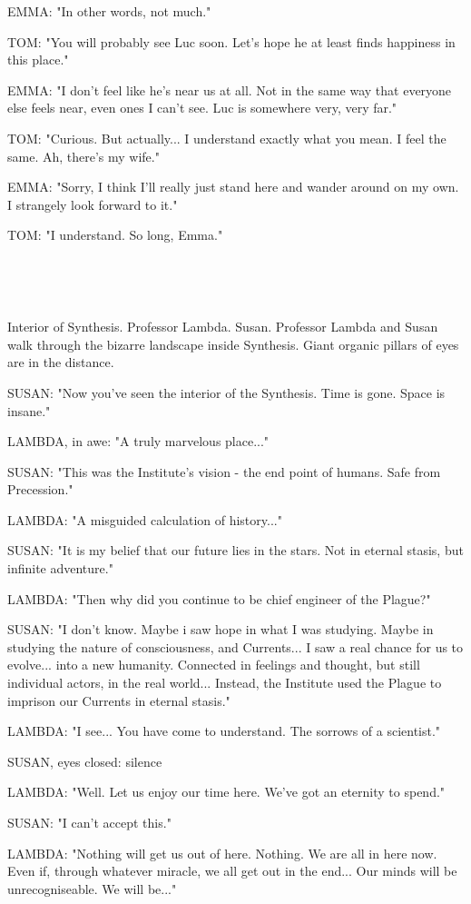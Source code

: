 \documentclass[11pt]{article}
\begin{document}
EMMA: "In other words, not much."

TOM: "You will probably see Luc soon.
Let's hope he at least finds happiness in this place."

EMMA: "I don't feel like he's near us at all.
Not in the same way that everyone else feels near, even ones I can't see.
Luc is somewhere very, very far."

TOM: "Curious. But actually... I understand exactly what you mean.
I feel the same.
Ah, there's my wife."

EMMA: "Sorry, I think I'll really just stand here and wander around on my own.
I strangely look forward to it."

TOM: "I understand. So long, Emma."

\ 

\ 

Interior of Synthesis.
Professor Lambda. Susan. 
Professor Lambda and Susan walk through the bizarre landscape inside Synthesis.
Giant organic pillars of eyes are in the distance.

SUSAN: "Now you've seen the interior of the Synthesis.
Time is gone. Space is insane."

LAMBDA, in awe: "A truly marvelous place..."

SUSAN: "This was the Institute's vision - the end point of humans. 
Safe from Precession."

LAMBDA: "A misguided calculation of history..."

SUSAN: "It is my belief that our future lies in the stars. 
Not in eternal stasis, but infinite adventure."

LAMBDA: "Then why did you continue to be chief engineer of the Plague?"

SUSAN: "I don't know. 
Maybe i saw hope in what I was studying.
Maybe in studying the nature of consciousness, and Currents...
I saw a real chance for us to evolve...
into a new humanity.
Connected in feelings and thought, but still individual actors, in the real world...
Instead, the Institute used the Plague to imprison our Currents in eternal stasis."

LAMBDA: "I see... You have come to understand.
The sorrows of a scientist."

SUSAN, eyes closed: silence

LAMBDA: "Well. 
Let us enjoy our time here. 
We've got an eternity to spend."

SUSAN: "I can't accept this."

LAMBDA: "Nothing will get us out of here. 
Nothing.
We are all in here now.
Even if, through whatever miracle, we all get out in the end...
Our minds will be unrecogniseable.
We will be..."
\end{document}
